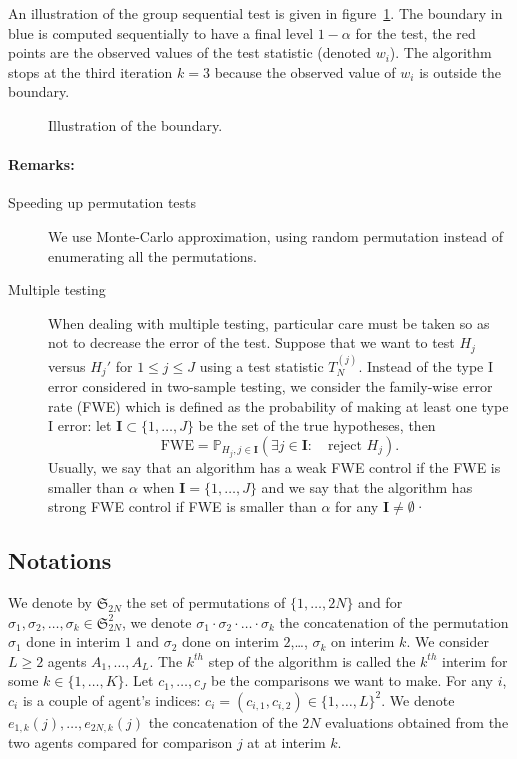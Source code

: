 \documentclass{article}
\theoremstyle{plain}
\theoremstyle{remark}
\renewcommand{\P}{\mathbb{P}}
\renewcommand{\S}{\mathfrak{S}}
\newcommand{\1}{\mathbbm{1}}
\numberwithin{equation}{section}
\begin{document}
An illustration of the group sequential test is given in figure~\ref{fig:gst}. The boundary in blue is computed sequentially to have a final level $1-\alpha$ for the test, the red points are the observed values of the test statistic (denoted $w_i$). The algorithm stops at the third iteration $k=3$ because the observed value of $w_i$ is outside the boundary.

\begin{figure}
\begin{center}

\caption{Illustration of the boundary.\label{fig:gst}}
\end{center}
\end{figure}


\paragraph{Remarks:}
\begin{description}
\item[Speeding up permutation tests]
We use Monte-Carlo approximation, using random permutation instead of enumerating all the permutations.

\item[Multiple testing]
When dealing with multiple testing, particular care must be taken so as not to decrease the error of the test. Suppose that we want to test $H_j$ versus $H_j'$ for $1\le j\le J$ using a test statistic $T_{N}^{(j)}$. Instead of the type I error considered in two-sample testing, we consider the family-wise error rate (FWE) which is defined as the probability of making at least one type I error: let $\textbf{I}\subset \{1,\dots,J\}$ be the set of the true hypotheses, then 
$$\mathrm{FWE} = \P_{H_j, j \in \textbf{I}}\left(\exists j \in \textbf{I}:\quad  \text{reject }H_j \right).$$
Usually, we say that an algorithm has a weak FWE control if the FWE is smaller than $\alpha$ when $\textbf{I}=\{1,\dots,J\}$ and we say that the algorithm has strong FWE control if FWE is smaller than $\alpha$ for any $\textbf{I}\neq \emptyset$· 
\end{description}

\subsection{Notations}
We denote by $\S_{2N}$ the set of permutations of $\{1,\dots,2N\}$ and for $\sigma_1,\sigma_2,\dots,\sigma_k \in \S_{2N}^2$, we denote $\sigma_1 \cdot \sigma_2 \cdot \ldots \cdot \sigma_k$ the concatenation of the permutation $\sigma_1$ done in interim $1$ and $\sigma_2$ done on interim $2$,\dots, $\sigma_k$ on interim $k$. We consider $L\ge 2$ agents $A_1,\dots,A_L$. The $k^{th}$ step of the algorithm is called the $k^{th}$ interim for some $k \in \{1,\dots,K\}$. Let $c_1,\dots,c_J$ be the comparisons we want to make. For any $i$, $c_i$ is a couple of agent's indices: $c_i=(c_{i,1},c_{i,2}) \in \{1,\dots,L\}^2$. We denote $e_{1,k}(j), \dots, e_{2N, k}(j)$ the concatenation of the $2N$ evaluations obtained from the two agents compared for comparison $j$ at at interim $k$.
\end{document}
